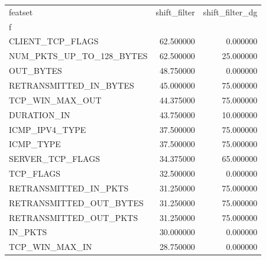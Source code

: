 \begin{tabular}{lrr}
\toprule
featset & shift_filter & shift_filter_dg \\
f &  &  \\
\midrule
CLIENT_TCP_FLAGS & 62.500000 & 0.000000 \\
NUM_PKTS_UP_TO_128_BYTES & 62.500000 & 25.000000 \\
OUT_BYTES & 48.750000 & 0.000000 \\
RETRANSMITTED_IN_BYTES & 45.000000 & 75.000000 \\
TCP_WIN_MAX_OUT & 44.375000 & 75.000000 \\
DURATION_IN & 43.750000 & 10.000000 \\
ICMP_IPV4_TYPE & 37.500000 & 75.000000 \\
ICMP_TYPE & 37.500000 & 75.000000 \\
SERVER_TCP_FLAGS & 34.375000 & 65.000000 \\
TCP_FLAGS & 32.500000 & 0.000000 \\
RETRANSMITTED_IN_PKTS & 31.250000 & 75.000000 \\
RETRANSMITTED_OUT_BYTES & 31.250000 & 75.000000 \\
RETRANSMITTED_OUT_PKTS & 31.250000 & 75.000000 \\
IN_PKTS & 30.000000 & 0.000000 \\
TCP_WIN_MAX_IN & 28.750000 & 0.000000 \\
\bottomrule
\end{tabular}
